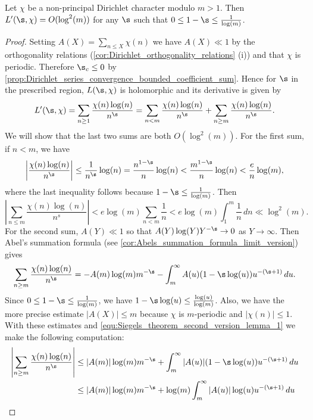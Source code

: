     \begin{lemma}\label{lem:Siegels_theorem_second_version_lemma}
      Let $\chi$ be a non-principal Dirichlet character modulo $m > 1$. Then $L'(\s,\chi) = O(\log^{2}(m))$ for any $\s$ such that $0 \le 1-\s \le \frac{1}{\log(m)}$.
    \end{lemma}
    \begin{proof}
      Setting $A(X) = \sum_{n \le X}\chi(n)$ we have $A(X) \ll 1$ by the orthogonality relations (\cref{cor:Dirichlet_orthogonality_relations} (i)) and that $\chi$ is periodic. Therefore $\s_{c} \le 0$ by \cref{prop:Dirichlet_series_convergence_bounded_coefficient_sum}. Hence for $\s$ in the prescribed region, $L(\s,\chi)$ is holomorphic and its derivative is given by
      \[
        L'(\s,\chi) = \sum_{n \ge 1}\frac{\chi(n)\log(n)}{n^{\s}} = \sum_{n < m}\frac{\chi(n)\log(n)}{n^{\s}}+\sum_{n \ge m}\frac{\chi(n)\log(n)}{n^{\s}}.
      \]
      We will show that the last two sums are both $O(\log^{2}(m))$. For the first sum, if $n < m$, we have
      \[
        \left|\frac{\chi(n)\log(n)}{n^{\s}}\right| \le \frac{1}{n^{\s}}\log(n) = \frac{n^{1-\s}}{n}\log(n) < \frac{m^{1-\s}}{n}\log(n) < \frac{e}{n}\log(m),
      \]
      where the last inequality follows because $1-\s \le \frac{1}{\log(m)}$. Then
      \[
        \left|\sum_{n \le m}\frac{\chi(n)\log(n)}{n^{s}}\right| < e\log(m)\sum_{n < m}\frac{1}{n} < e\log(m)\int_{1}^{m}\frac{1}{n}\,dn \ll \log^{2}(m).
      \]
      For the second sum, $A(Y) \ll 1$ so that $A(Y)\log(Y)Y^{-\s} \to 0$ as $Y \to \infty$. Then Abel's summation formula (see \cref{cor:Abels_summation_formula_limit_version}) gives
      \begin{equation}\label{equ:Siegels_theorem_second_version_lemma_1}
        \sum_{n \ge m}\frac{\chi(n)\log(n)}{n^{\s}} = -A(m)\log(m)m^{-\s}-\int_{m}^{\infty}A(u)(1-\s\log(u))u^{-(\s+1)}\,du.
      \end{equation}
      Since $0 \le 1-\s \le \frac{1}{\log(m)}$, we have $1-\s\log(u) \le \frac{\log(u)}{\log(m)}$. Also, we have the more precise estimate $|A(X)| \le m$ because $\chi$ is $m$-periodic and $|\chi(n)| \le 1$. With these estimates and \cref{equ:Siegels_theorem_second_version_lemma_1} we make the following computation:
      \begin{align*}
        \left|\sum_{n \ge m}\frac{\chi(n)\log(n)}{n^{\s}}\right| &\le |A(m)|\log(m)m^{-\s}+\int_{m}^{\infty}|A(u)|(1-\s\log(u))u^{-(\s+1)}\,du \\
        &\le |A(m)|\log(m)m^{-\s}+\log(m)\int_{m}^{\infty}|A(u)|\log(u)u^{-(\s+1)}\,du \\

\end{align*}
\end{proof}
